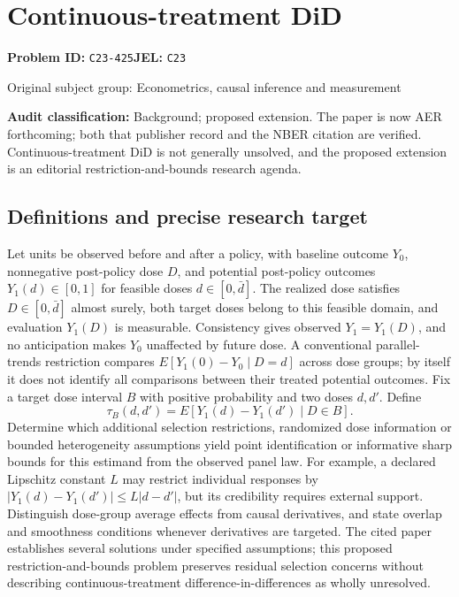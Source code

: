 \documentclass[11pt,a4paper]{article}
\begin{document}
\section*{Continuous-treatment DiD}
\textbf{Problem ID:} \texttt{C23-425}\quad \textbf{JEL:} \texttt{C23}\par
\label{problem:OP-0423}
{\sffamily\small\color{muted}Original subject group: Econometrics, causal inference and measurement\par}
\label{definitions:problem:30007705}
\textbf{Audit classification:} Background; proposed extension. The paper is now AER forthcoming; both that publisher record and the NBER citation are verified. Continuous-treatment DiD is not generally unsolved, and the proposed extension is an editorial restriction-and-bounds research agenda.
\subsection*{Definitions and precise research target}
Let units be observed before and after a policy, with baseline outcome \(Y_0\), nonnegative post-policy dose \(D\), and potential post-policy outcomes \(Y_1(d)\in[0,1]\) for feasible doses \(d\in[0,\bar d]\). The realized dose satisfies \(D\in[0,\bar d]\) almost surely, both target doses belong to this feasible domain, and evaluation \(Y_1(D)\) is measurable. Consistency gives observed \(Y_1=Y_1(D)\), and no anticipation makes \(Y_0\) unaffected by future dose. A conventional parallel-trends restriction compares \(E[Y_1(0)-Y_0\mid D=d]\) across dose groups; by itself it does not identify all comparisons between their treated potential outcomes. Fix a target dose interval \(B\) with positive probability and two doses \(d,d'\). Define
\[
\tau_B(d,d')=E[Y_1(d)-Y_1(d')\mid D\in B].
\]
Determine which additional selection restrictions, randomized dose information or bounded heterogeneity assumptions yield point identification or informative sharp bounds for this estimand from the observed panel law. For example, a declared Lipschitz constant \(L\) may restrict individual responses by \(|Y_1(d)-Y_1(d')|\leq L|d-d'|\), but its credibility requires external support. Distinguish dose-group average effects from causal derivatives, and state overlap and smoothness conditions whenever derivatives are targeted. The cited paper establishes several solutions under specified assumptions; this proposed restriction-and-bounds problem preserves residual selection concerns without describing continuous-treatment difference-in-differences as wholly unresolved.
\end{document}
